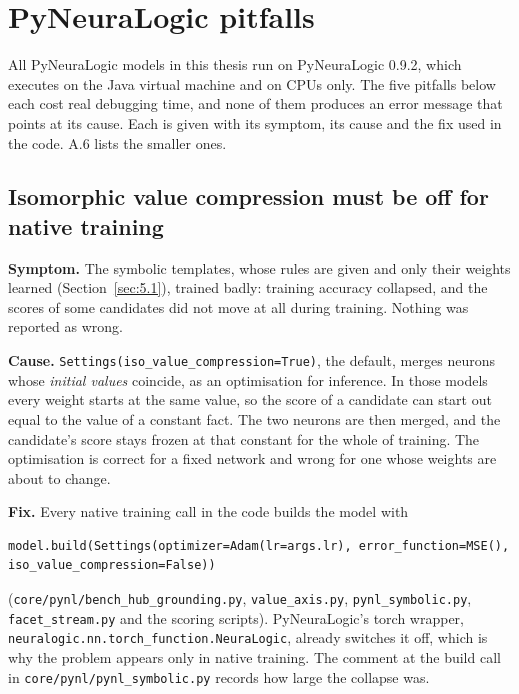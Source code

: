 \chapter{PyNeuraLogic pitfalls}\label{app:A}

All PyNeuraLogic models in this thesis run on PyNeuraLogic 0.9.2, which executes on the Java virtual machine and on CPUs only. The five pitfalls below each cost real debugging time, and none of them produces an error message that points at its cause. Each is given with its symptom, its cause and the fix used in the code. A.6 lists the smaller ones.

\section{Isomorphic value compression must be off for native training}\label{sec:A.1}

\textbf{Symptom.} The symbolic templates, whose rules are given and only their weights learned (Section~\ref{sec:5.1}), trained badly: training accuracy collapsed, and the scores of some candidates did not move at all during training. Nothing was reported as wrong.

\textbf{Cause.} \texttt{Settings(iso\_value\_compression=True)}, the default, merges neurons whose \emph{initial values} coincide, as an optimisation for inference. In those models every weight starts at the same value, so the score of a candidate can start out equal to the value of a constant fact. The two neurons are then merged, and the candidate's score stays frozen at that constant for the whole of training. The optimisation is correct for a fixed network and wrong for one whose weights are about to change.

\textbf{Fix.} Every native training call in the code builds the model with

\begin{Verbatim}[fontsize=\small,breaklines]
model.build(Settings(optimizer=Adam(lr=args.lr), error_function=MSE(), iso_value_compression=False))
\end{Verbatim}

(\texttt{core/pynl/bench\_hub\_grounding.py}, \texttt{value\_axis.py}, \texttt{pynl\_symbolic.py}, \texttt{facet\_stream.py} and the scoring scripts). PyNeuraLogic's torch wrapper, \texttt{neuralogic.nn.torch\_function.NeuraLogic}, already switches it off, which is why the problem appears only in native training. The comment at the build call in \texttt{core/pynl/pynl\_symbolic.py} records how large the collapse was.

